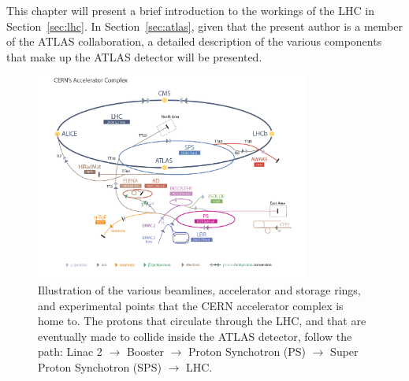This chapter will present a brief introduction to the workings of the LHC in Section~\ref{sec:lhc}.
In Section~\ref{sec:atlas}, given that the present author is a member of the ATLAS collaboration,
a detailed description of the various components that make up the ATLAS detector will be presented.



\begin{figure}[!htb]
    \begin{center}
        \includegraphics[width=0.8\textwidth]{figures/chapter2/cern_accelerator_complex2}
        \caption{
            Illustration of the various beamlines, accelerator and storage rings, and experimental
            points that the CERN accelerator complex is home to.
            The protons that circulate through the LHC, and that are eventually made to collide inside
            the ATLAS detector, follow the path: Linac 2 $\rightarrow$ Booster $\rightarrow$ Proton Synchotron (PS)
            $\rightarrow$ Super Proton Synchotron (SPS) $\rightarrow$ LHC.
        }
        \label{fig:cern_complex}
    \end{center}
\end{figure}


